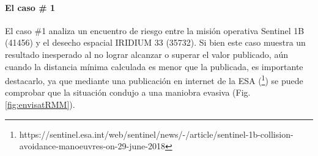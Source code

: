 \begin{table}[!h]
 \caption{PoC que se obtienen con el m\'etodo de Akella \& Alfriend para los tres casos de matrices de covarianza distintas.}
\label{tab:resulakella}
\end{table}

\paragraph{El caso \# 1}
El caso \#1 analiza un encuentro de riesgo entre la misi\'on operativa Sentinel 1B (41456) y el desecho espacial IRIDIUM 33 (35732). Si bien este caso muestra un resultado inesperado al no lograr alcanzar o superar el valor publicado, a\'un cuando la distancia m\'inima calculada es menor que la publicada, es importante destacarlo, ya que mediante una publicaci\'on en internet de la ESA (\footnote{https://sentinel.esa.int/web/sentinel/news/-/article/sentinel-1b-collision-avoidance-manoeuvres-on-29-june-2018}) se puede comprobar que la situaci\'on condujo a una maniobra evasiva (Fig. \ref{fig:envisatRMM}). 

